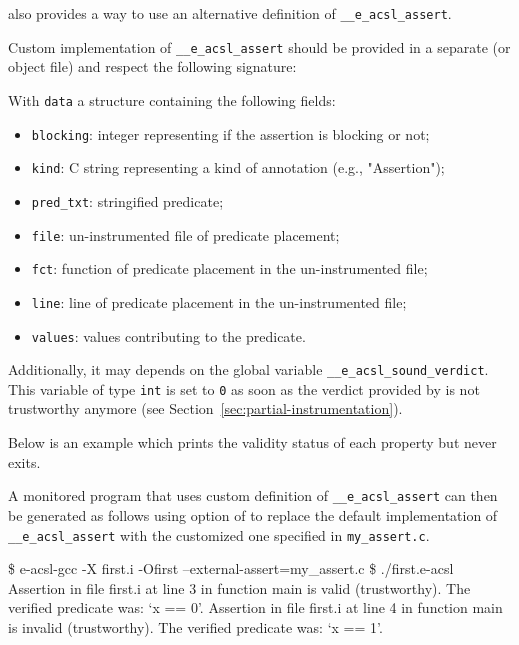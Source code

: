 \eacslgcc also provides a way to use an alternative definition of
\texttt{\_\_e\_acsl\_assert}.

Custom implementation of \texttt{\_\_e\_acsl\_assert}
should be provided in a separate \C (or object file) and respect the
following signature:


With \texttt{data} a structure containing the following fields:
\begin{itemize}
  \item \texttt{blocking}: integer representing if the assertion is blocking or
        not;
  \item \texttt{kind}: C string representing a kind of annotation (e.g.,
        "Assertion");
  \item \texttt{pred\_txt}: stringified predicate;
  \item \texttt{file}: un-instrumented file of predicate placement;
  \item \texttt{fct}: function of predicate placement in the un-instrumented
        file;
  \item \texttt{line}: line of predicate placement in the un-instrumented file;
  \item \texttt{values}: values contributing to the predicate.
\end{itemize}

Additionally, it may depends on the global variable
\texttt{\_\_e\_acsl\_sound\_verdict}. This
variable of type \texttt{int} is set to \texttt{0} as soon as the verdict
provided by \eacsl is not trustworthy anymore (see
Section~\ref{sec:partial-instrumentation}).

Below is an example which prints the validity status of each property but never
exits.


A monitored program that uses custom definition of
\texttt{\_\_e\_acsl\_assert} can then be generated
as follows using  option of \eacslgcc to replace the
default implementation of \texttt{\_\_e\_acsl\_assert}
with the customized one specified in \texttt{my\_assert.c}.

\begin{logs}
\$ e-acsl-gcc -X first.i -Ofirst --external-assert=my_assert.c
\$ ./first.e-acsl
Assertion in file first.i at line 3 in function main is valid (trustworthy).
The verified predicate was: `x == 0'.
Assertion in file first.i at line 4 in function main is invalid (trustworthy).
The verified predicate was: `x == 1'.
\end{logs}

